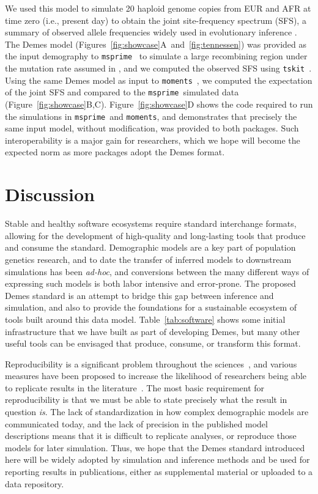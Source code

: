 \documentclass[11pt]{article}
\newcommand{\msprime}[0]{\texttt{msprime}}
\newcommand{\moments}[0]{\texttt{moments}}
\newcommand{\tskit}[0]{\texttt{tskit}}
\begin{document}
We used this model to simulate 20 haploid genome copies from EUR and AFR
at time zero (i.e., present day) to obtain the joint site-frequency spectrum
(SFS), a summary of observed allele frequencies widely used in evolutionary
inference
\citep{bustamante2001directional,gutenkunst2009inferring,tennessen2012evolution,
jouganous2017inferring,kamm2017efficient,kim2017inference}.
The Demes model (Figures~\ref{fig:showcase}A~and~\ref{fig:tennessen}) was
provided as the input demography to \msprime\ \citep{baumdicker2021-iu} to
simulate a large recombining region under the mutation rate assumed in
\citet{tennessen2012evolution}, and we computed the observed SFS using \tskit\
\citep{ralph2020efficiently}. Using the same Demes model as input to \moments\
\citep{jouganous2017inferring}, we computed the expectation of the joint SFS
and compared to the \msprime\ simulated data (Figure~\ref{fig:showcase}B,C).
Figure~\ref{fig:showcase}D shows the code required to run the
simulations in \msprime\ and \moments, and demonstrates that
precisely the same input model, without modification, was provided to both packages.
Such interoperability is a major gain for researchers, which we
hope will become the expected norm as more packages adopt the Demes
format.

\section*{Discussion}
Stable and healthy software ecosystems require standard interchange
formats, allowing for the development of high-quality and long-lasting
tools that produce and consume the standard.
Demographic models are a key part of population genetics research,
and to date the transfer of inferred models to downstream simulations
has been \textit{ad-hoc}, and conversions between the many different ways
of expressing such models is both labor intensive and error-prone.
The proposed Demes standard is an attempt to bridge this gap
between inference and simulation, and also to provide the foundations
for a sustainable ecosystem of tools built around this data model.
Table~\ref{tab:software} shows some initial infrastructure that we have
built as part of developing Demes, but many other useful tools
can be envisaged that produce, consume, or transform this format.

Reproducibility is a significant problem throughout the
sciences~\citep{baker20161}, and various measures have been
proposed to increase the likelihood of researchers being
able to replicate results in the
literature~\citep{munafo2017manifesto}. The most basic requirement
for reproducibility is that we must be able to state precisely what
the result in question \emph{is}. The lack of standardization in how
complex demographic models are communicated today, and the lack of
precision in the published model descriptions means that it is difficult
to replicate analyses, or reproduce those models for later simulation.
Thus, we hope that the Demes standard introduced here will be widely adopted
by simulation and inference methods and be used for reporting results in
publications, either as supplemental material or uploaded to a data repository.
\end{document}
